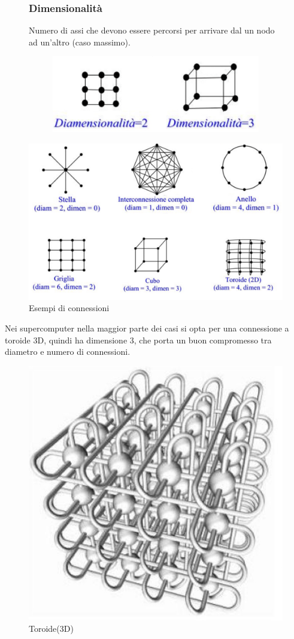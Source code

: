 \begin{figure}[H]
    \centering
    \begin{minipage}{0.45\textwidth}
        \subsubsection{Dimensionalità}
        Numero di assi che devono essere percorsi per arrivare dal un nodo ad un'altro (caso massimo).
    \end{minipage}
    \hfill
    \begin{minipage}{0.45\textwidth}
        \begin{figure}[H]
            \centering
            \includegraphics[width=0.65\linewidth]{assets/dimensionalita.png}
        \end{figure}
    \end{minipage}
\end{figure}

\begin{figure}[H]
    \centering
    \includegraphics[width=0.5\linewidth]{assets/connessioni.png}
    \caption{Esempi di connessioni}
\end{figure}

\begin{note}
    Nei supercomputer nella maggior parte dei casi si opta per una connessione a toroide 3D, quindi ha dimensione 3, che porta un buon compromesso tra diametro e numero di connessioni.

    \begin{figure}[H]
        \centering
        \includegraphics[width=0.3\linewidth]{assets/toroide3d.jpg}
        \caption{Toroide(3D)}
    \end{figure}
\end{note}

